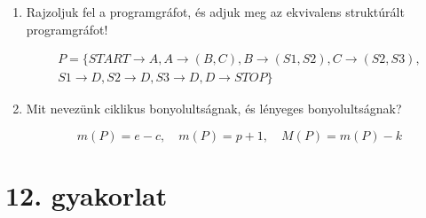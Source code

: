 \documentclass[a4paper]{article}
\begin{document}
\begin{enumerate}
Rajzoljuk fel a programgráfot a pszeudókód alapján!

\begin{verbatim}
N: A
    IF B
        THEN C
        ELSE GOTO N
\end{verbatim}

\item

Rajzoljuk fel a programgráfot, és adjuk meg az ekvivalens struktúrált programgráfot!

\begin{gather*}
P = \{
START \rightarrow A, A \rightarrow (B, C), B \rightarrow (S1, S2), C \rightarrow (S2, S3), \\
S1 \rightarrow D, S2 \rightarrow D, S3 \rightarrow D, D \rightarrow STOP
\}
\end{gather*}

\item

Mit nevezünk ciklikus bonyolultságnak, és lényeges bonyolultságnak?

$$
m(P) = e - c, \quad
m(P) = p + 1, \quad
M(P) = m(P) - k
$$

\end{enumerate}

\section*{12. gyakorlat}
\end{document}
